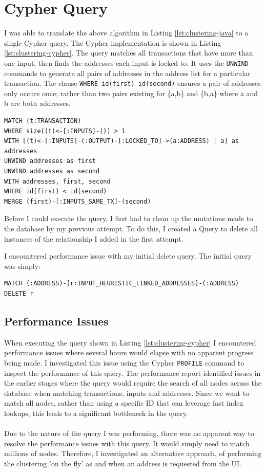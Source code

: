 \section{Cypher Query}
I was able to translate the above algorithm in Listing \ref{lst:clustering-java} to a single Cypher query. The Cypher implementation is shown in Listing \ref{lst:clustering-cypher}.
The query matches all transactions that have more than one input, then finds the addresses each input is locked to. It uses the \texttt{UNWIND} commands to generate all pairs of addresses in the address list for a particular transaction. The clause \texttt{WHERE id(first) \< id(second)} ensures a pair of addresses only occurs once; rather than two pairs existing for \{a,b\} and \{b,a\} where a and b are both addresses.

\begin{lstlisting}[caption={Cypher Implementation}, label={lst:clustering-cypher}, breaklines=true, basicstyle=\small]
MATCH (t:TRANSACTION)
WHERE size((t)<-[:INPUTS]-()) > 1
WITH [(t)<-[:INPUTS]-(:OUTPUT)-[:LOCKED_TO]->(a:ADDRESS) | a] as addresses
UNWIND addresses as first
UNWIND addresses as second
WITH addresses, first, second
WHERE id(first) < id(second)
MERGE (first)-[:INPUTS_SAME_TX]-(second)
\end{lstlisting}

Before I could execute the query, I first had to clean up the mutations made to the database by my previous attempt. To do this, I created a Query to delete all instances of the relationship I added in the first attempt. 

I encountered performance issue with my initial delete query. 
The initial query was simply:
\begin{lstlisting}
MATCH (:ADDRESS)-[r:INPUT_HEURISTIC_LINKED_ADDRESSES]-(:ADDRESS)
DELETE r
\end{lstlisting}

\subsection{Performance Issues}
When executing the query shown in Listing \ref{lst:clustering-cypher} I encountered performance issues where several hours would elapse with no apparent progress being made. I investigated this issue using the Cypher \texttt{PROFILE} command to inspect the performance of this query. The performance report identified issues in the earlier stages where the query would require the search of all nodes across the database when matching transactions, inputs and addresses. Since we want to match all nodes, rather than using a specific ID that can leverage fast index lookups, this leads to a significant bottleneck in the query. 
\\\\
Due to the nature of the query I was performing, there was no apparent way to resolve the performance issues with this query. It would simply need to match millions of nodes. Therefore, I investigated an alternative approach, of performing the clustering 'on the fly' as and when an address is requested from the UI. 

